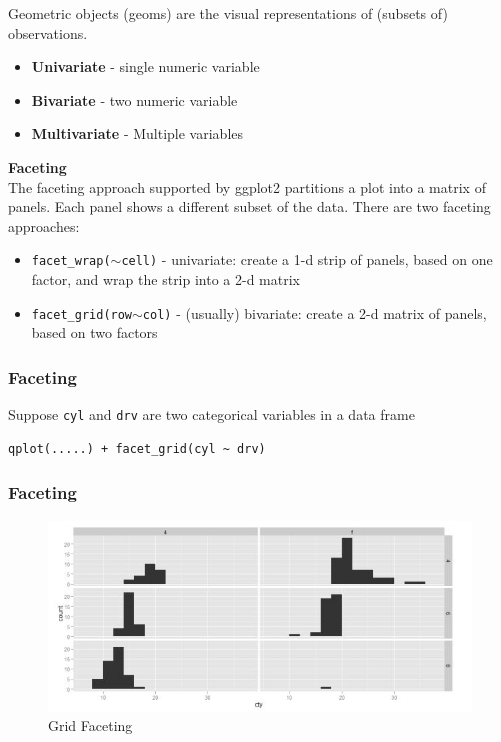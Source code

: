 \documentclass{beamer}
\begin{document}
\begin{frame}
	\Large
	Geometric objects (geoms) are the visual representations of (subsets of) observations.
	\begin{itemize}
		\item \textbf{Univariate} - single numeric variable
		\item \textbf{Bivariate} - two numeric variable
		\item \textbf{Multivariate} - Multiple variables
	\end{itemize}
\end{frame}
\begin{frame}
	\Large
	\noindent \textbf{Faceting}\\
	The faceting approach supported by ggplot2 partitions a plot into a matrix of panels. Each panel shows a different subset of the data.
	There are two faceting approaches:
	
	\begin{itemize}
		\item \texttt{facet\_wrap($\sim$cell)} - univariate: create a 1-d strip of panels, based on one factor, and wrap the strip into a 2-d matrix
		\item \texttt{facet\_grid(row$\sim$col)} - (usually) bivariate: create a 2-d matrix of panels, based on two factors
	\end{itemize}
\end{frame}
\begin{frame}[fragile]
	\frametitle{Faceting}
\Large
Suppose \texttt{cyl} and \texttt{drv} are two categorical variables in a data frame
\begin{framed}
\begin{verbatim}
qplot(.....) + facet_grid(cyl ~ drv)
\end{verbatim}
\end{framed}

\end{frame}
\begin{frame}
	\frametitle{Faceting}
	\begin{figure}
\centering
\includegraphics[width=1.1\linewidth]{gridfacetting}
\caption{Grid Faceting}
\label{fig:gridfacetting}
\end{figure}

\end{frame}
\end{document}
